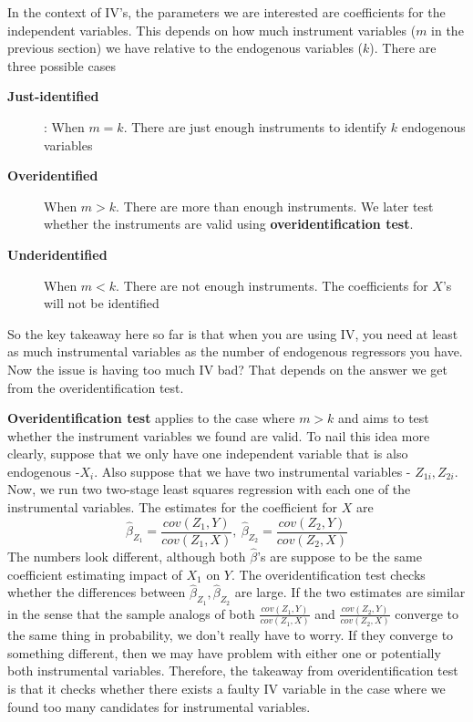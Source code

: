 \documentclass[12pt]{article}
\theoremstyle{definition}
\theoremstyle{property}
\theoremstyle{assumption}
\theoremstyle{example}
\theoremstyle{comment}
\begin{document}
In the context of IV's, the parameters we are interested are coefficients for the independent variables. This depends on how much instrument variables ($m$ in the previous section) we have relative to the endogenous variables ($k$). There are three possible cases
\begin{description}
\item[\textbf{Just-identified}]: When $m=k$. There are just enough instruments to identify $k$ endogenous variables
\item[\textbf{Overidentified}] When $m>k$. There are more than enough instruments. We later test whether the instruments are valid using \textbf{overidentification test}.
\item[\textbf{Underidentified}] When $m<k$. There are not enough instruments. The coefficients for $X$'s will not be identified 
\end{description}
So the key takeaway here so far is that when you are using IV, you need at least as much instrumental variables as the number of endogenous regressors you have. Now the issue is having too much IV bad? That depends on the answer we get from the overidentification test.\par\medskip
\textbf{Overidentification test} applies to the case where $m>k$ and aims to test whether the instrument variables we found are valid. To nail this idea more clearly, suppose that we only have one independent variable that is also endogenous  -$X_i$. Also suppose that we have two instrumental variables - $Z_{1i}, Z_{2i}$. Now, we run two two-stage least squares regression with each one of the instrumental variables. The estimates for the coefficient for $X$ are 
\[
\hat{\beta}_{Z_1}=\frac{cov(Z_1,Y)}{cov(Z_1,X)}, \ \hat{\beta}_{Z_2}=\frac{cov(Z_2,Y)}{cov(Z_2,X)}
\]
The numbers look different, although both $\hat{\beta}$'s are suppose to be the same coefficient estimating impact of $X_1$ on $Y$. The overidentification test checks whether the differences between $\hat{\beta}_{Z_1}, \hat{\beta}_{Z_2}$ are large. If the two estimates are similar in the sense that the sample analogs of both $\frac{cov(Z_1,Y)}{cov(Z_1,X)}$ and $\frac{cov(Z_2,Y)}{cov(Z_2,X)}$ converge to the same thing in probability, we don't really have to worry. If they converge to something different, then we may have problem with either one or potentially both instrumental variables. Therefore, the takeaway from overidentification test is that it checks whether there exists a faulty IV variable in the case where we found too many candidates for instrumental variables. 
\end{document}
